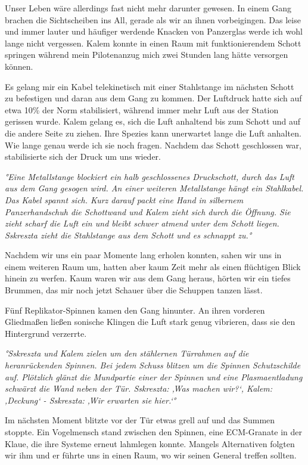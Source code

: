 \documentclass[11pt]{article}
\begin{document}
Unser Leben wäre allerdings fast nicht mehr darunter gewesen. In einem
Gang brachen die Sichtscheiben ins All, gerade als wir an ihnen
vorbeigingen. Das leise und immer lauter und häufiger werdende Knacken
von Panzerglas werde ich wohl lange nicht vergessen. Kalem konnte in
einen Raum mit funktionierendem Schott springen während mein
Pilotenanzug mich zwei Stunden lang hätte versorgen können.

Es gelang mir ein Kabel telekinetisch mit einer Stahlstange im nächsten
Schott zu befestigen und daran aus dem Gang zu kommen. Der Luftdruck
hatte sich auf etwa 10\% der Norm stabilisiert, während immer mehr Luft
aus der Station gerissen wurde. Kalem gelang es, sich die Luft anhaltend
bis zum Schott und auf die andere Seite zu ziehen. Ihre Spezies kann
unerwartet lange die Luft anhalten. Wie lange genau werde ich sie noch
fragen. Nachdem das Schott geschlossen war, stabilisierte sich der Druck
um uns wieder.

\emph{°Eine Metallstange blockiert ein halb geschlossenes Druckschott,
durch das Luft aus dem Gang gesogen wird. An einer weiteren Metallstange
hängt ein Stahlkabel. Das Kabel spannt sich. Kurz darauf packt eine Hand
in silbernem Panzerhandschuh die Schottwand und Kalem zieht sich durch
die Öffnung. Sie zieht scharf die Luft ein und bleibt schwer atmend
unter dem Schott liegen. Sskreszta zieht die Stahlstange aus dem Schott
und es schnappt zu.°}

Nachdem wir uns ein paar Momente lang erholen konnten, sahen wir uns in
einem weiteren Raum um, hatten aber kaum Zeit mehr als einen flüchtigen
Blick hinein zu werfen. Kaum waren wir aus dem Gang heraus, hörten wir
ein tiefes Brummen, das mir noch jetzt Schauer über die Schuppen tanzen
lässt.

Fünf Replikator-Spinnen kamen den Gang hinunter. An ihren vorderen
Gliedmaßen ließen sonische Klingen die Luft stark genug vibrieren, dass
sie den Hintergrund verzerrte.

\emph{°Sskreszta und Kalem zielen um den stählernen Türrahmen auf die
heranrückenden Spinnen. Bei jedem Schuss blitzen um die Spinnen
Schutzschilde auf. Plötzlich glänzt die Mundpartie einer der Spinnen und
eine Plasmaentladung schwärzt die Wand neben der Tür. Sskreszta: ‚Was
machen wir?`, Kalem: ‚Deckung` - Sskreszta: ‚Wir erwarten sie hier.`°}

Im nächsten Moment blitzte vor der Tür etwas grell auf und das Summen
stoppte. Ein Vogelmensch stand zwischen den Spinnen, eine ECM-Granate in
der Klaue, die ihre Systeme erneut lahmlegen konnte. Mangels
Alternativen folgten wir ihm und er führte uns in einen Raum, wo wir
seinen General treffen sollten.
\end{document}
